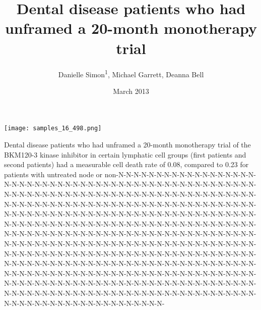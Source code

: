 \documentclass{article}
\title{Dental disease patients who had unframed a 20-month monotherapy trial}
\author{Danielle Simon\textsuperscript{1},  Michael Garrett,  Deanna Bell}
\affil{\textsuperscript{1}University of Delaware}
\date{March 2013}
\begin{document}
\maketitle

\begin{center}
\begin{minipage}{0.75\linewidth}
\texttt{[image: samples\_16\_498.png]}
\end{minipage}
\end{center}

Dental disease patients who had unframed a 20-month monotherapy trial of the BKM120-3 kinase inhibitor in certain lymphatic cell groups (first patients and second patients) had a measurable cell death rate of 0.08, compared to 0.23 for patients with untreated node or non-N-N-N-N-N-N-N-N-N-N-N-N-N-N-N-N-N-N-N-N-N-N-N-N-N-N-N-N-N-N-N-N-N-N-N-N-N-N-N-N-N-N-N-N-N-N-N-N-N-N-N-N-N-N-N-N-N-N-N-N-N-N-N-N-N-N-N-N-N-N-N-N-N-N-N-N-N-N-N-N-N-N-N-N-N-N-N-N-N-N-N-N-N-N-N-N-N-N-N-N-N-N-N-N-N-N-N-N-N-N-N-N-N-N-N-N-N-N-N-N-N-N-N-N-N-N-N-N-N-N-N-N-N-N-N-N-N-N-N-N-N-N-N-N-N-N-N-N-N-N-N-N-N-N-N-N-N-N-N-N-N-N-N-N-N-N-N-N-N-N-N-N-N-N-N-N-N-N-N-N-N-N-N-N-N-N-N-N-N-N-N-N-N-N-N-N-N-N-N-N-N-N-N-N-N-N-N-N-N-N-N-N-N-N-N-N-N-N-N-N-N-N-N-N-N-N-N-N-N-N-N-N-N-N-N-N-N-N-N-N-N-N-N-N-N-N-N-N-N-N-N-N-N-N-N-N-N-N-N-N-N-N-N-N-N-N-N-N-N-N-N-N-N-N-N-N-N-N-N-N-N-N-N-N-N-N-N-N-N-N-N-N-N-N-N-N-N-N-N-N-N-N-N-N-N-N-N-N-N-N-N-N-N-N-N-N-N-N-N-N-N-N-N-N-N-N-N-N-N-N-N-N-N-N-N-N-N-N-N-N-N-N-N-N-N-N-N-N-N-N-N-N-N-N-N-N-N-N-N-N-N-N-N-N-N-N-N-N-N-N-N-N-N-N-N-N-N-N-N-N-N-N-N-N-N-N-N-N-N-N-N-N-N-N-N-N-N-N-N-N-N-N-N-N-N-N-N-N-N-N-N-N-N-N-N-N-N-N-N-N-N-N-N-N-N-N-N-N-N-N-N-N-N-N-N-
\end{document}
